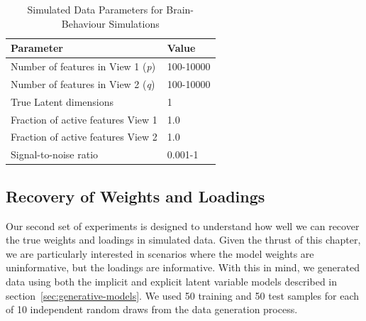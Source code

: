 \begin{table}
    \centering
    \caption{Simulated Data Parameters for Brain-Behaviour Simulations}
    \begin{tabular}{| l | l |}
        \hline
        \textbf{Parameter}                        & \textbf{Value}                               \\
        \hline
        Number of features in View 1 (\textit{p}) & 100-10000 \\
        Number of features in View 2 (\textit{q}) & 100-10000 \\
        True Latent dimensions                    & 1                                            \\
        Fraction of active features View 1            & 1.0                                          \\
        Fraction of active features View 2            & 1.0                                          \\
        Signal-to-noise ratio                    & 0.001-1 \\
        \hline
    \end{tabular}\label{tab:simulated-data-parameters-bb}
\end{table}

\subsection{Recovery of Weights and Loadings}

Our second set of experiments is designed to understand how well we can recover the true weights and \gls{loadings} in simulated data.
Given the thrust of this chapter, we are particularly interested in scenarios where the model weights are uninformative, but the \gls{loadings} are informative.
With this in mind, we generated data using both the implicit and explicit latent variable models described in section~\ref{sec:generative-models}.
We used 50 training and 50 test samples for each of 10 independent random draws from the data generation process.

